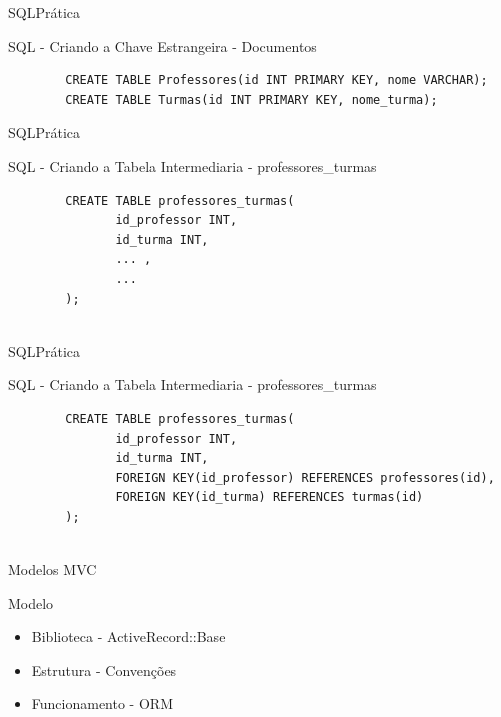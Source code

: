 \documentclass{beamer}
\begin{document}
\begin{frame}[fragile]{SQL}{Prática}
	\begin{block} {SQL - Criando a Chave Estrangeira - Documentos}
		\begin{verbatim}
		CREATE TABLE Professores(id INT PRIMARY KEY, nome VARCHAR);
		CREATE TABLE Turmas(id INT PRIMARY KEY, nome_turma);
		\end{verbatim}
	\end{block}
\end{frame}

\begin{frame}[fragile]{SQL}{Prática}
	\begin{block} {SQL - Criando a Tabela Intermediaria - professores\_turmas}
		\begin{verbatim}
		CREATE TABLE professores_turmas(
		       id_professor INT, 
		       id_turma INT, 
		       ... ,
		       ...
		);
		
		\end{verbatim}
	\end{block}
\end{frame}

\begin{frame}[fragile]{SQL}{Prática}
	\begin{block} {SQL - Criando a Tabela Intermediaria - professores\_turmas}
		\begin{verbatim}
		CREATE TABLE professores_turmas(
		       id_professor INT, 
		       id_turma INT, 
		       FOREIGN KEY(id_professor) REFERENCES professores(id), 
		       FOREIGN KEY(id_turma) REFERENCES turmas(id)
		);
		
		\end{verbatim}
	\end{block}
\end{frame}

\begin{frame}{Modelos MVC}
	\begin{block} {\LARGE Modelo}
		\begin{itemize} \itemsep 2em
			\item{\LARGE Biblioteca - ActiveRecord::Base}
			\item{\LARGE Estrutura - Convenções}
			\item{\LARGE Funcionamento - ORM}
		\end{itemize}
	\end{block}
\end{frame}
\end{document}
